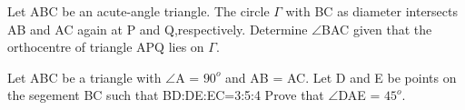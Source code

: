 \item Let ABC be an acute-angle triangle. The circle $\Gamma$ with BC as diameter intersects AB and AC again at P and Q,respectively. Determine $\angle$BAC given that the orthocentre of triangle APQ lies on $\Gamma$.

\item Let ABC be a triangle with $\angle$A = $90^{o}$ and AB = AC. Let D and E be points on the segement BC such that BD:DE:EC=3:5:4 Prove that $\angle$DAE = $45^{o}$.

